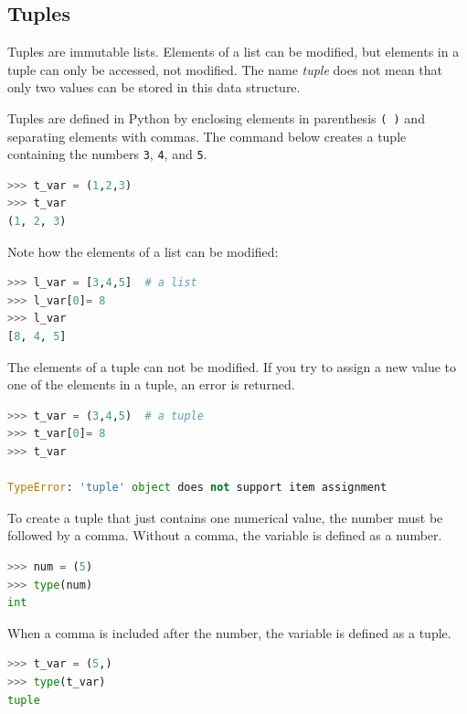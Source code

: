 \documentclass{book}
\begin{document}
    
        \subsection{Tuples}\label{tuples}
    




    
        Tuples are immutable lists. Elements of a list can be modified, but
elements in a tuple can only be accessed, not modified. The name
\emph{tuple} does not mean that only two values can be stored in this
data structure.

Tuples are defined in Python by enclosing elements in parenthesis
\lstinline!( )! and separating elements with commas. The command below
creates a tuple containing the numbers \lstinline!3!, \lstinline!4!, and
\lstinline!5!.

\begin{lstlisting}[language=Python]
>>> t_var = (1,2,3)
>>> t_var
(1, 2, 3)
\end{lstlisting}

Note how the elements of a list can be modified:

\begin{lstlisting}[language=Python]
>>> l_var = [3,4,5]  # a list
>>> l_var[0]= 8
>>> l_var
[8, 4, 5]
\end{lstlisting}

The elements of a tuple can not be modified. If you try to assign a new
value to one of the elements in a tuple, an error is returned.

\begin{lstlisting}[language=Python]
>>> t_var = (3,4,5)  # a tuple
>>> t_var[0]= 8
>>> t_var

TypeError: 'tuple' object does not support item assignment
\end{lstlisting}

To create a tuple that just contains one numerical value, the number
must be followed by a comma. Without a comma, the variable is defined as
a number.

\begin{lstlisting}[language=Python]
>>> num = (5)
>>> type(num)
int
\end{lstlisting}

When a comma is included after the number, the variable is defined as a
tuple.

\begin{lstlisting}[language=Python]
>>> t_var = (5,)
>>> type(t_var)
tuple
\end{lstlisting}
    
\end{document}
